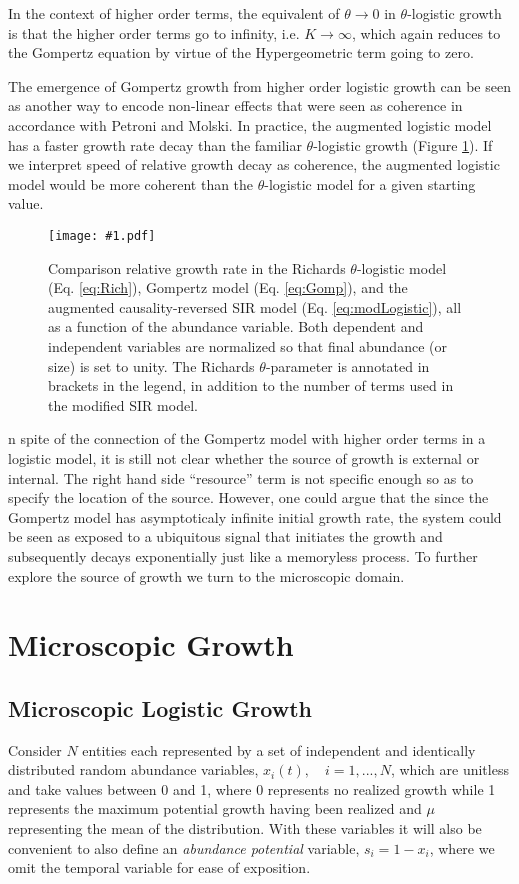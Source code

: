 \documentclass{article}
\newcommand{\insertPdfFig}[3]{
  \begin{figure}[H]
  \centering
  \texttt{[image: \#1.pdf]}
  \caption{#2}
  \label{fig:#1}
  \end{figure}
}
\begin{document}
 In the context of higher order terms, the equivalent of $\theta\rightarrow 0$ in $\theta$-logistic growth is that the higher order terms go to infinity, i.e. $K \rightarrow \infty$, which again reduces to the Gompertz equation by virtue of the Hypergeometric term going to zero. 

 The emergence of Gompertz growth from higher order logistic growth can be seen as another way to encode non-linear effects that were seen as coherence in accordance with Petroni and Molski. In practice, the augmented logistic model has a faster growth rate decay than the familiar $\theta$-logistic growth (Figure \ref{fig:hypergeometric_plain}). If we interpret speed of relative growth decay as coherence, the augmented logistic model would be more coherent than the $\theta$-logistic model for a given starting value. 

\insertPdfFig{hypergeometric_plain}{Comparison relative growth rate in the Richards $\theta$-logistic model (Eq. \ref{eq:Rich}), Gompertz model (Eq. \ref{eq:Gomp}), and the augmented causality-reversed SIR model (Eq. \ref{eq:modLogistic}), all as a function of the abundance variable. Both dependent and independent variables are normalized so that final abundance (or size) is set to unity. The Richards $\theta$-parameter is annotated in brackets in the legend, in addition to the number of terms used in the modified SIR model.} 

In spite of the connection of the Gompertz model with higher order terms in a logistic model, it is still not clear whether the source of growth is external or internal. The right hand side ``resource'' term is not specific enough so as to specify the location of the source. However, one could argue that the since the Gompertz model has asymptoticaly infinite initial growth rate, the system could be seen as exposed to a ubiquitous signal that initiates the growth and subsequently decays exponentially just like a memoryless process. To further explore the source of growth we turn to the microscopic domain.

\section{Microscopic Growth}
\label{sec:micro}

\subsection{Microscopic Logistic Growth}
Consider $N$ entities each represented by a set of independent and identically distributed random abundance variables, $x_i(t), \quad i=1, ..., N$, which are unitless and take values between 0 and 1, where 0 represents no realized growth while 1 represents the maximum potential growth having been realized and $\mu$ representing the mean of the distribution. With these variables it will also be convenient to also define an \textit{abundance potential} variable, $s_i = 1 - x_i$, where we omit the temporal variable for ease of exposition.
\end{document}
